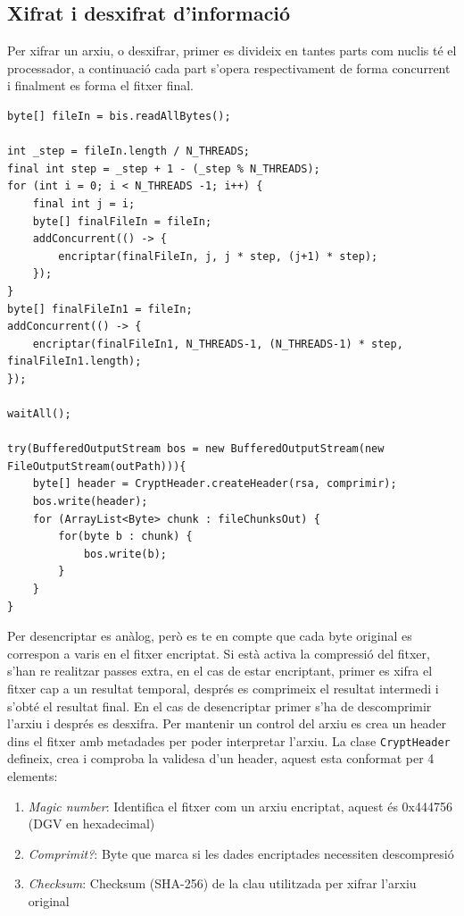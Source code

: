 \documentclass{ieeetj}
\begin{document}
\subsection{Xifrat i desxifrat d'informació}
Per xifrar un arxiu, o desxifrar, primer es divideix en tantes parts com nuclis té el processador, a continuació cada part s'opera respectivament de forma concurrent i finalment es forma el fitxer final.
\begin{lstlisting}
byte[] fileIn = bis.readAllBytes();

int _step = fileIn.length / N_THREADS;
final int step = _step + 1 - (_step % N_THREADS);
for (int i = 0; i < N_THREADS -1; i++) {
    final int j = i;
    byte[] finalFileIn = fileIn;
    addConcurrent(() -> {
        encriptar(finalFileIn, j, j * step, (j+1) * step);
    });
}
byte[] finalFileIn1 = fileIn;
addConcurrent(() -> {
    encriptar(finalFileIn1, N_THREADS-1, (N_THREADS-1) * step, finalFileIn1.length);
});

waitAll();

try(BufferedOutputStream bos = new BufferedOutputStream(new FileOutputStream(outPath))){
    byte[] header = CryptHeader.createHeader(rsa, comprimir);
    bos.write(header);
    for (ArrayList<Byte> chunk : fileChunksOut) {
        for(byte b : chunk) {
            bos.write(b);
        }
    }
}
\end{lstlisting}
Per desencriptar es anàlog, però es te en compte que cada byte original es correspon a varis en el fitxer encriptat. \newline
Si està activa la compressió del fitxer, s'han re realitzar passes extra, en el cas de estar encriptant, primer es xifra el fitxer cap a un resultat temporal, després es comprimeix el resultat intermedi i s'obté el resultat final. En el cas de desencriptar primer s'ha de descomprimir l'arxiu i després es desxifra.
\newline
Per mantenir un control del arxiu es crea un header dins el fitxer amb metadades per poder interpretar l'arxiu. La clase \texttt{CryptHeader} defineix, crea i comproba la validesa d'un header, aquest esta conformat per 4 elements:
\begin{enumerate}
    \item \emph{Magic number}: Identifica el fitxer com un arxiu encriptat, aquest és 0x444756 (DGV en hexadecimal)
    \item \emph{Comprimit?}: Byte que marca si les dades encriptades necessiten descompresió
    \item \emph{Checksum}: Checksum (SHA-256) de la clau utilitzada per xifrar l'arxiu original
\end{enumerate}
\end{document}
